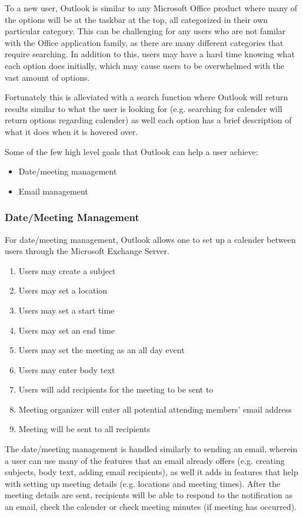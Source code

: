 \documentclass{sigchi}
\begin{document}
To a new user, Outlook is similar to any Microsoft Office product where many of the options will be at the taskbar at the top, all categorized in their own particular category. 
This can be challenging for any users who are not familar with the Office application family, as there are many different categories that require searching. 
In addition to this, users may have a hard time knowing what each option does initially, which may cause users to be overwhelmed with the vast amount of options. 

Fortunately this is alleviated with a search function where Outlook will return results similar to what the user is looking for (e.g. searching for calender will return options regarding calender) as well each option has a brief description of what it does when it is hovered over.

Some of the few high level goals that Outlook can help a user achieve:
\begin{itemize}
	\item Date/meeting management
	\item Email management
\end{itemize}

\subsubsection{Date/Meeting Management}

For date/meeting management, Outlook allows one to set up a calender between users through the Microsoft Exchange Server.
\begin{enumerate}
\item Users may create a subject
\item Users may set a location
\item Users may set a start time
\item Users may set an end time
\item Users may set the meeting as an all day event
\item Users may enter body text
\item Users will add recipients for the meeting to be sent to
\item Meeting organizer will enter all potential attending members' email address
\item Meeting will be sent to all recipients
\end{enumerate}

The date/meeting management is handled similarly to sending an email, wherein a user can use many of the features that an email already offers (e.g. creating subjects, body text, adding email recipients), as well it adds in features that help with setting up meeting details (e.g. locations and meeting times).
After the meeting details are sent, recipients will be able to respond to the notification as an email, check the calender or check meeting minutes (if meeting has occurred).
\end{document}
